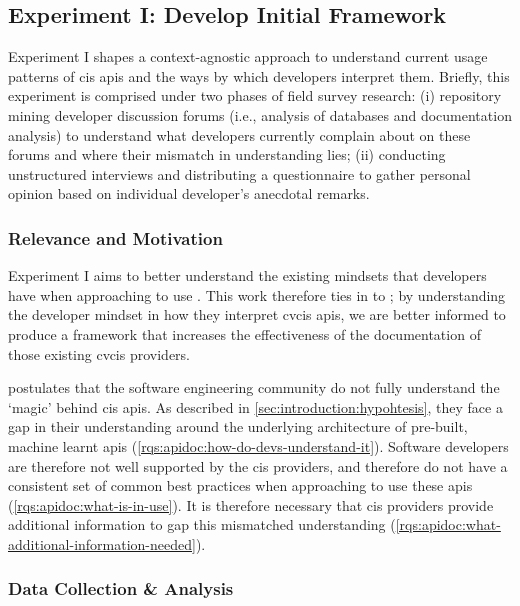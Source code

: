 \subsection{Experiment I: Develop Initial Framework}
\label{ssec:research-methodology:experiments:1}

Experiment I shapes a context-agnostic approach to understand current usage patterns of \gls{cis} \glspl{api} and the ways by which developers interpret them. Briefly, this experiment is comprised under two phases of field survey research: (i) repository mining developer discussion forums (i.e., analysis of databases and documentation analysis) to understand what developers currently complain about on these forums and where their mismatch in understanding lies; (ii) conducting unstructured interviews and distributing a questionnaire to gather personal opinion based on individual developer's anecdotal remarks.

\subsubsection{Relevance and Motivation}

Experiment I aims to better understand the existing mindsets that developers have when approaching to use . This work therefore ties in to ; by understanding the developer mindset in how they interpret \gls{cvcis} \glspl{api}, we are better informed to produce a framework that increases the effectiveness of the documentation of those existing \gls{cvcis} providers.

 postulates that the software engineering community do not fully understand the `magic' behind \gls{cis} \glspl{api}. As described in \cref{sec:introduction:hypohtesis}, they face a gap in their understanding around the underlying architecture of pre-built, machine learnt \glspl{api} (\ref{rqs:apidoc:how-do-devs-understand-it}). Software developers are therefore not well supported by the \gls{cis} providers, and therefore do not have a consistent set of common best practices when approaching to use these \glspl{api} (\ref{rqs:apidoc:what-is-in-use}). It is therefore necessary that \gls{cis} providers provide additional information to gap this mismatched understanding (\ref{rqs:apidoc:what-additional-information-needed}). 

\subsubsection{Data Collection \& Analysis}

